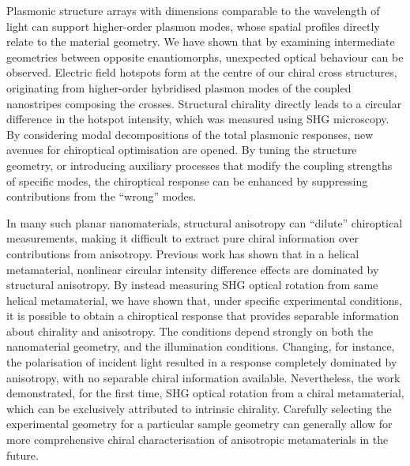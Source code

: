 Plasmonic structure arrays with dimensions comparable to the wavelength of light can support higher-order plasmon modes, whose spatial profiles directly relate to the material geometry. We have shown that by examining intermediate geometries between opposite enantiomorphs, unexpected optical behaviour can be observed. Electric field hotspots form at the centre of our chiral cross structures, originating from higher-order hybridised plasmon modes of the coupled nanostripes composing the crosses. Structural chirality directly leads to a circular difference in the hotspot intensity, which was measured using SHG microscopy. By considering modal decompositions of the total plasmonic responses, new avenues for chiroptical optimisation are opened. By tuning the structure geometry, or introducing auxiliary processes that modify the coupling strengths of specific modes, the chiroptical response can be enhanced by suppressing contributions from the ``wrong'' modes.

In many such planar nanomaterials, structural anisotropy can ``dilute'' chiroptical measurements, making it difficult to extract pure chiral information over contributions from anisotropy. Previous work has shown that in a helical metamaterial, nonlinear circular intensity difference effects are dominated by structural anisotropy. By instead measuring SHG optical rotation from same helical metamaterial, we have shown that, under specific experimental conditions, it is possible to obtain a chiroptical response that provides separable information about chirality and anisotropy. The conditions depend strongly on both the nanomaterial geometry, and the illumination conditions. Changing, for instance, the polarisation of incident light resulted in a response completely dominated by anisotropy, with no separable chiral information available. Nevertheless, the work demonstrated, for the first time, SHG optical rotation from a chiral metamaterial, which can be exclusively attributed to intrinsic chirality. Carefully selecting the experimental geometry for a particular sample geometry can generally allow for more comprehensive chiral characterisation of anisotropic metamaterials in the future.

